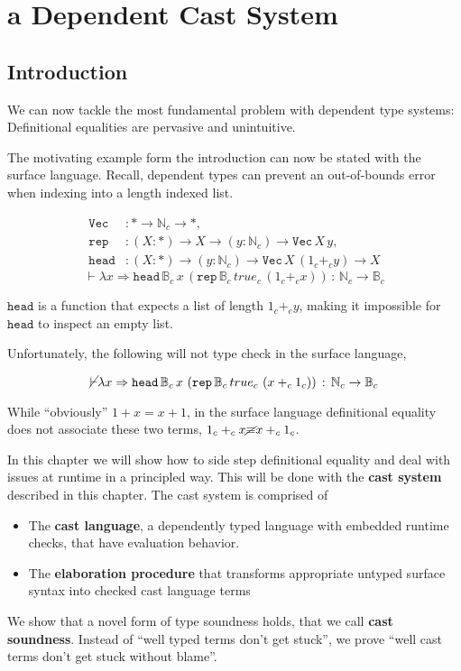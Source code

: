 \chapter{a Dependent Cast System}
\label{chapter:Cast}
\thispagestyle{myheadings}

\section{Introduction}

We can now tackle the most fundamental problem with dependent type
systems: Definitional equalities are pervasive and unintuitive.

The motivating example form the introduction can now be stated with
the surface language. Recall, dependent types can prevent an out-of-bounds
error when indexing into a length indexed list. 

\begin{align*}
\mathtt{Vec} & :*\rightarrow\mathbb{N}_{c}\rightarrow*,\\
\mathtt{rep} & :\left(X:*\right)\rightarrow X\rightarrow\left(y:\mathbb{N}_{c}\right)\rightarrow\mathtt{Vec\,}X\,y,\\
\mathtt{head} & :\left(X:*\right)\rightarrow\left(y:\mathbb{N}_{c}\right)\rightarrow\mathtt{Vec}\,X\,\left(1_{c}+_{c}y\right)\rightarrow X
\end{align*}
\[
\vdash\lambda x\Rightarrow\mathtt{head}\,\mathbb{B}_{c}\,x\,\left(\mathtt{rep}\,\mathbb{B}_{c}\,true_{c}\,\left(1_{c}+_{c}x\right)\right)\,:\,\mathbb{N}_{c}\rightarrow\mathbb{B}_{c}
\]

$\mathtt{head}$ is a function that expects a list of length $1_{c}+_{c}y$,
making it impossible for $\mathtt{head}$ to inspect an empty list.

Unfortunately, the following will not type check in the surface language,

\[
\cancel{\vdash}\lambda x\Rightarrow\mathtt{head}\,\mathbb{B}_{c}\,x\,\left(\mathtt{rep}\,\mathbb{B}_{c}\,true_{c}\,\left(x+_{c}1_{c}\right)\right)\,:\,\mathbb{N}_{c}\rightarrow\mathbb{B}_{c}
\]

\sloppy While ``obviously'' $1+x=x+1$, in the surface language
definitional equality does not associate these two terms, $1_{c}+_{c}x\cancel{\equiv}x+_{c}1_{c}$. 

In this chapter we will show how to side step definitional equality
and deal with issues at runtime in a principled way. This will be
done with the \textbf{cast system} described in this chapter. The
cast system is comprised of
\begin{itemize}
\item The \textbf{cast language}, a dependently typed language with embedded
runtime checks, that have evaluation behavior.
\item The \textbf{elaboration procedure} that transforms appropriate untyped
surface syntax into checked cast language terms
\end{itemize}
We show that a novel form of type soundness holds, that we call \textbf{cast
soundness}. Instead of ``well typed terms don't get stuck'', we
prove ``well cast terms don't get stuck without blame''. 

